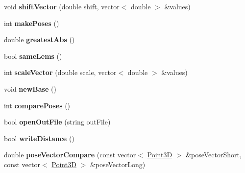 \begin{DoxyCompactItemize}
\item 
\hypertarget{classstick_adc65776ee12c40f80450571802f4acfd}{}void {\bfseries shift\+Vector} (double shift, vector$<$ double $>$ \&values)\label{classstick_adc65776ee12c40f80450571802f4acfd}

\item 
\hypertarget{classstick_aef4c5387930195569b084e938e87d0bc}{}int {\bfseries make\+Poses} ()\label{classstick_aef4c5387930195569b084e938e87d0bc}

\item 
\hypertarget{classstick_a4383198a45c79a1af2a936a558257d9c}{}double {\bfseries greatest\+Abs} ()\label{classstick_a4383198a45c79a1af2a936a558257d9c}

\item 
\hypertarget{classstick_a141238f04f95eceb8bcfd4c7b8ee6d6b}{}bool {\bfseries same\+Lems} ()\label{classstick_a141238f04f95eceb8bcfd4c7b8ee6d6b}

\item 
\hypertarget{classstick_a1a5497681b1132b1be093ef0cbac1101}{}int {\bfseries scale\+Vector} (double scale, vector$<$ double $>$ \&values)\label{classstick_a1a5497681b1132b1be093ef0cbac1101}

\item 
\hypertarget{classstick_a828fd6cdf87fc8106af83f659e9862be}{}void {\bfseries new\+Base} ()\label{classstick_a828fd6cdf87fc8106af83f659e9862be}

\item 
\hypertarget{classstick_a2520866d36250d4fe46cb85e03f23ddd}{}int {\bfseries compare\+Poses} ()\label{classstick_a2520866d36250d4fe46cb85e03f23ddd}

\item 
\hypertarget{classstick_add28d1e1e4adf1a8a99737f454c1654f}{}bool {\bfseries open\+Out\+File} (string out\+File)\label{classstick_add28d1e1e4adf1a8a99737f454c1654f}

\item 
\hypertarget{classstick_a15f76af5dbc0c04526134bad8c2ab8e1}{}bool {\bfseries write\+Distance} ()\label{classstick_a15f76af5dbc0c04526134bad8c2ab8e1}

\item 
\hypertarget{classstick_a7b42ae0baaf2a02d7fbb0582f0468820}{}double {\bfseries pose\+Vector\+Compare} (const vector$<$ \hyperlink{classPoint3D}{Point3\+D} $>$ \&pose\+Vector\+Short, const vector$<$ \hyperlink{classPoint3D}{Point3\+D} $>$ \&pose\+Vector\+Long)\label{classstick_a7b42ae0baaf2a02d7fbb0582f0468820}


\end{DoxyCompactItemize}
